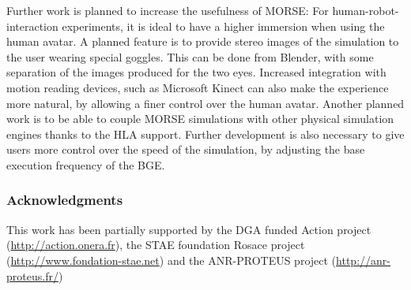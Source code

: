 \documentclass{llncs}
\begin{document}
Further work is planned to increase the usefulness of MORSE:
For human-robot-interaction experiments, it is ideal to have a higher
immersion when using the human avatar.  A planned feature is to provide stereo
images of the simulation to the user wearing special goggles. This can be done
from Blender, with some separation of the images produced for the two eyes.
Increased integration with motion reading devices, such as Microsoft Kinect can
also make the experience more natural, by allowing a finer control over the
human avatar.
Another planned work is to be able to couple MORSE simulations with
other physical simulation engines thanks to the HLA support.
Further development is also necessary to give users more control over the speed
of the simulation, by adjusting the base execution frequency of the BGE.

\subsubsection*{Acknowledgments}
This work has been partially supported by the DGA funded Action project
(\url{http://action.onera.fr}), the STAE foundation Rosace project
(\url{http://www.fondation-stae.net}) and the ANR-PROTEUS
project (\url{http://anr-proteus.fr/})


% 

\end{document}

